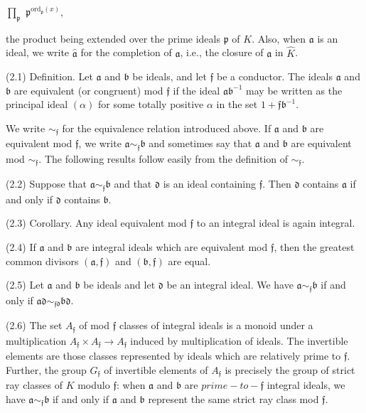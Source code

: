 \documentclass[11pt]{article}
\begin{document}
\par
\(\prod _{𝔭}\) \(𝔭^{\mathrm{ord}_{𝔭}(x)}\),\par
\par
the product being extended over the prime ideals \(𝔭\) of \(K\). Also, when \(𝔞\) is an ideal, we write \(\widehat{𝔞}\) for the completion of \(𝔞\), i.e., the closure of \(𝔞\) in \(\widehat{K}\).\par
\par
(2.1) Definition. Let \(𝔞\) and \(𝔟\) be ideals, and let \(𝔣\) be a conductor. The ideals \(𝔞\) and \(𝔟\) are equivalent (or congruent) mod \(𝔣\) if the ideal \(𝔞𝔟^{-1}\) may be written as the principal ideal \((\alpha )\) for some totally positive \(\alpha \) in the set \(1+𝔣𝔟^{-1}\).\par
\par
We write \(\sim _{𝔣}\) for the equivalence relation introduced above. If \(𝔞\) and \(𝔟\) are equivalent mod \(𝔣\), we write \(𝔞\sim _{𝔣}𝔟\) and sometimes say that \(𝔞\) and \(𝔟\) are equivalent mod \(\sim _{𝔣}\). The following results follow easily from the definition of \(\sim _{𝔣}\).\par
\par
(2.2) Suppose that \(𝔞\sim _{𝔣}𝔟\) and that \(𝔡\) is an ideal containing \(𝔣\). Then \(𝔡\) contains \(𝔞\) if and only if \(𝔡\) contains \(𝔟\).\par
\par
(2.3) Corollary. Any ideal equivalent mod \(𝔣\) to an integral ideal is again integral.\par
\par
(2.4) If \(𝔞\) and \(𝔟\) are integral ideals which are equivalent mod \(𝔣\), then the greatest common divisors \((𝔞,𝔣)\) and \((𝔟,𝔣)\) are equal.\par
\par
(2.5) Let \(𝔞\) and \(𝔟\) be ideals and let \(𝔡\) be an integral ideal. We have \(𝔞\sim _{𝔣}𝔟\) if and only if \(𝔞𝔡\sim _{𝔣𝔡}𝔟𝔡\).\par
\par
(2.6) The set \(A_{𝔣}\) of mod \(𝔣\) classes of integral ideals is a monoid under a multiplication \(A_{𝔣}\times A_{𝔣}\to A_{𝔣}\) induced by multiplication of ideals. The invertible elements are those classes represented by ideals which are relatively prime to \(𝔣\). Further, the group \(G_{𝔣}\) of invertible elements of \(A_{𝔣}\) is precisely the group of strict ray classes of \(K\) modulo \(𝔣\): when \(𝔞\) and \(𝔟\) are \(prime-to-𝔣\) integral ideals, we have \(𝔞\sim _{𝔣}𝔟\) if and only if \(𝔞\) and \(𝔟\) represent the same strict ray class mod \(𝔣\).\par
\end{document}
